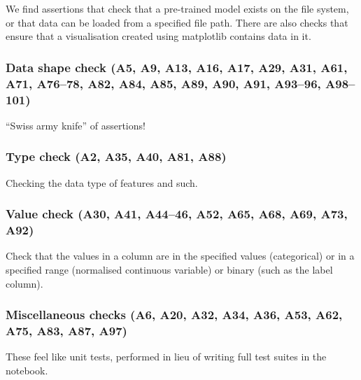We find assertions that check that a pre-trained model exists on the file system, or that data can be loaded from a specified file path. There are also checks that ensure that a visualisation created using matplotlib contains data in it.

\subsubsection{Data shape check (A5, A9, A13, A16, A17, A29, A31, A61, A71, A76--78, A82, A84, A85, A89, A90, A91, A93--96, A98--101)}

``Swiss army knife'' of assertions!

\subsubsection{Type check (A2, A35, A40, A81, A88)}

Checking the data type of features and such.

\subsubsection{Value check (A30, A41, A44--46, A52, A65, A68, A69, A73, A92)}

Check that the values in a column are in the specified values (categorical) or in a specified range (normalised continuous variable) or binary (such as the label column).

\subsubsection{Miscellaneous checks (A6, A20, A32, A34, A36, A53, A62, A75, A83, A87, A97)}

These feel like unit tests, performed in lieu of writing full test suites in the notebook.

 


%
%





